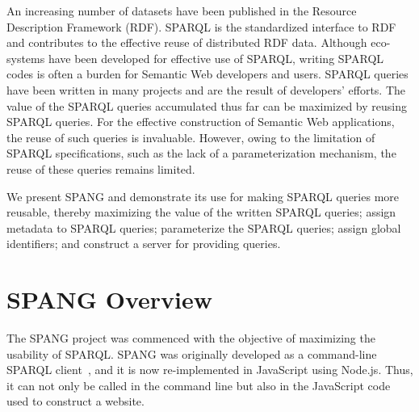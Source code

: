 \documentclass[runningheads]{llncs}
\begin{document}
An increasing number of datasets have been published in the Resource Description Framework (RDF).
SPARQL is the standardized interface to RDF and contributes to the effective reuse of distributed RDF data. 
Although eco-systems have been developed for effective use of SPARQL, writing SPARQL codes is often a burden for Semantic Web developers and users. 
SPARQL queries have been written in many projects and are the result of developers' efforts. 
The value of the SPARQL queries accumulated thus far can be maximized by reusing SPARQL queries.
For the effective construction of Semantic Web applications, the reuse of such queries is invaluable.
However, owing to the limitation of SPARQL specifications, such as the lack of a parameterization mechanism, the reuse of these queries remains limited. 


We present SPANG and demonstrate its use for making SPARQL queries more reusable, thereby maximizing the value of the written SPARQL queries;
assign metadata to SPARQL queries;
parameterize the SPARQL queries;
assign global identifiers; and
construct a server for providing queries.


\section{SPANG Overview}

The SPANG project was commenced with the objective of maximizing the usability of SPARQL. 
SPANG was originally developed as a command-line SPARQL client~\cite{spang}, and it is now re-implemented in JavaScript using Node.js. Thus, it can not only be called in the command line but also in the JavaScript code used to construct a website.
\end{document}
